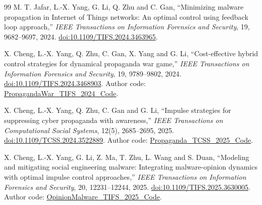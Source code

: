 \documentclass[11pt,a4paper]{article}
\theoremstyle{definition}
\theoremstyle{remark}
\begin{document}
\begin{thebibliography}{99}
 M. T. Jafar, L.-X. Yang, G. Li, Q. Zhu and C. Gan, ``Minimizing malware propagation in Internet of Things networks: An optimal control using feedback loop approach,'' \emph{IEEE Transactions on Information Forensics and Security}, 19, 9682--9697, 2024. \href{https://doi.org/10.1109/TIFS.2024.3463965}{doi:10.1109/TIFS.2024.3463965}.

 X. Cheng, L.-X. Yang, Q. Zhu, C. Gan, X. Yang and G. Li, ``Cost-effective hybrid control strategies for dynamical propaganda war game,'' \emph{IEEE Transactions on Information Forensics and Security}, 19, 9789--9802, 2024. \href{https://doi.org/10.1109/TIFS.2024.3468903}{doi:10.1109/TIFS.2024.3468903}. Author code: \href{https://github.com/XiaojuanCheng/PropagandaWar_TIFS_2024_Code}{PropagandaWar\_TIFS\_2024\_Code}.

 X. Cheng, L.-X. Yang, Q. Zhu, C. Gan and G. Li, ``Impulse strategies for suppressing cyber propaganda with awareness,'' \emph{IEEE Transactions on Computational Social Systems}, 12(5), 2685--2695, 2025. \href{https://doi.org/10.1109/TCSS.2024.3522889}{doi:10.1109/TCSS.2024.3522889}. Author code: \href{https://github.com/XiaojuanCheng/Propaganda_TCSS_2025_Code}{Propaganda\_TCSS\_2025\_Code}.

 X. Cheng, L.-X. Yang, G. Li, Z. Ma, T. Zhu, L. Wang and S. Duan, ``Modeling and mitigating social engineering malware: Integrating malware-opinion dynamics with optimal impulse control approaches,'' \emph{IEEE Transactions on Information Forensics and Security}, 20, 12231--12244, 2025. \href{https://doi.org/10.1109/TIFS.2025.3630005}{doi:10.1109/TIFS.2025.3630005}. Author code: \href{https://github.com/XiaojuanCheng/OpinionMalware_TIFS_2025_Code}{OpinionMalware\_TIFS\_2025\_Code}.
\end{thebibliography}
\end{document}
